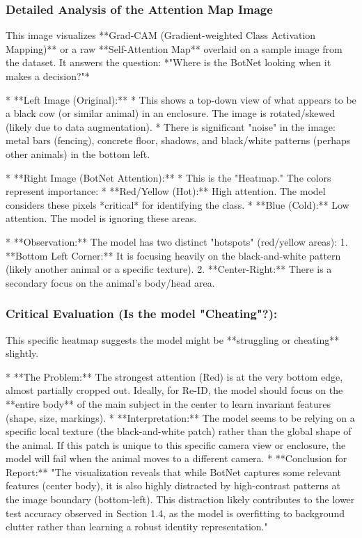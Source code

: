 \documentclass[a4paper,12pt]{article}
\begin{document}
\subsubsection*{Detailed Analysis of the Attention Map Image}

This image visualizes **Grad-CAM (Gradient-weighted Class Activation Mapping)** or a raw **Self-Attention Map** overlaid on a sample image from the dataset. It answers the question: *"Where is the BotNet looking when it makes a decision?"*

* **Left Image (Original):**
* This shows a top-down view of what appears to be a black cow (or similar animal) in an enclosure. The image is rotated/skewed (likely due to data augmentation).
* There is significant "noise" in the image: metal bars (fencing), concrete floor, shadows, and black/white patterns (perhaps other animals) in the bottom left.

* **Right Image (BotNet Attention):**
* This is the "Heatmap." The colors represent importance:
* **Red/Yellow (Hot):** High attention. The model considers these pixels *critical* for identifying the class.
* **Blue (Cold):** Low attention. The model is ignoring these areas.

* **Observation:** The model has two distinct "hotspots" (red/yellow areas):
1. **Bottom Left Corner:** It is focusing heavily on the black-and-white pattern (likely another animal or a specific texture).
2. **Center-Right:** There is a secondary focus on the animal's body/head area.

\subsubsection*{Critical Evaluation (Is the model "Cheating"?):}

This specific heatmap suggests the model might be **struggling or cheating** slightly.

* **The Problem:** The strongest attention (Red) is at the very bottom edge, almost partially cropped out. Ideally, for Re-ID, the model should focus on the **entire body** of the main subject in the center to learn invariant features (shape, size, markings).
* **Interpretation:** The model seems to be relying on a specific local texture (the black-and-white patch) rather than the global shape of the animal. If this patch is unique to this specific camera view or enclosure, the model will fail when the animal moves to a different camera.
* **Conclusion for Report:** "The visualization reveals that while BotNet captures some relevant features (center body), it is also highly distracted by high-contrast patterns at the image boundary (bottom-left). This distraction likely contributes to the lower test accuracy observed in Section 1.4, as the model is overfitting to background clutter rather than learning a robust identity representation."
\end{document}
